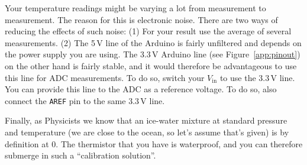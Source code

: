 
Your temperature readings might be varying a lot from measurement to measurement. The reason for this is electronic noise. There are two ways of reducing the effects of such noise: (1) For your result use the average of several measurements. (2) The 5\,V line of the Arduino is fairly unfiltered and depends on the power supply you are using. The 3.3\,V Arduino line (see Figure~\ref{app:pinout}) on the other hand is fairly stable, and it would therefore be advantageous to use this line for ADC measurements. To do so, switch your $V_\mathrm{in}$ to use the 3.3\,V line. You can provide this line to the ADC as a reference voltage. To do so, also connect the \lstinline{AREF} pin to the same 3.3\,V line.


Finally, as Physicists we know that an ice-water mixture at standard pressure and temperature (we are close to the ocean, so let's assume that's given) is by definition at 0\celsius. The thermistor that you have is waterproof, and you can therefore submerge in such a ``calibration solution''.

